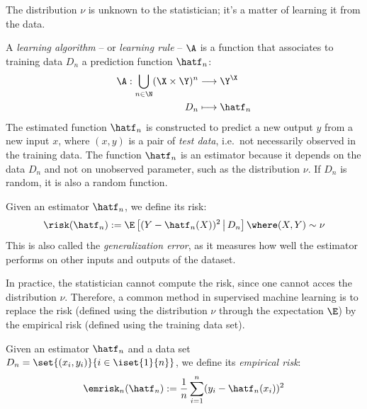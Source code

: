\documentclass[toc, titlepaged]{../cs-classes/cs-classes}
\begin{document}
The distribution $\nu$ is unknown to the statistician; it's a matter of learning it from the data.

\begin{definition}
    A \emph{learning algorithm} -- or \emph{learning rule} -- $\A$ is a function that associates to training data $D_n$ a prediction function $\hatf_n$:
    \begin{equation*}
        \begin{aligned}
            \A: \bigcup_{n\in\N} (\X\times\Y)^n &\longrightarrow \Y^\X\\
            D_n &\longmapsto \hatf_n
        \end{aligned}
    \end{equation*}
    The estimated function $\hatf_n$ is constructed to predict a new output $y$ from a new input $x$, where $(x, y)$ is a pair of \emph{test data}, i.e.~not necessarily observed in the training data. The function $\hatf_n$ is an estimator because it depends on the data $D_n$ and not on unobserved parameter, such as the distribution $\nu$. If $D_n$ is random, it is also a random function.
\end{definition}

\begin{definition}
    Given an estimator $\hatf_n$, we define its risk:
    \begin{equation}
        \label{eq:sq-risk}
        \risk(\hatf_n) := \E\left[(Y-\hatf_n(X))^2\,\big| \, D_n\right] \where (X, Y)\sim\nu
    \end{equation}
    This is also called the \emph{generalization error}, as it measures how well the estimator performs on other inputs and outputs of the dataset.
\end{definition}

In practice, the statistician cannot compute the risk, since one cannot acces the distribution $\nu$. Therefore, a common method in supervised machine learning is to replace the risk (defined using the distribution $\nu$ through the expectation $\E$) by the empirical risk (defined using the training data set).

\begin{definition}
    Given an estimator $\hatf_n$ and a data set $D_n=\set{(x_i, y_i)}{i\in\iset{1}{n}}$, we define its \emph{empirical risk}:
    \begin{equation}
        \label{eq:sq-empirical-risk}
        \emrisk_n(\hatf_n) := \frac{1}{n}\sum_{i=1}^n (y_i-\hatf_n(x_i))^2
    \end{equation}
\end{definition}
\end{document}
